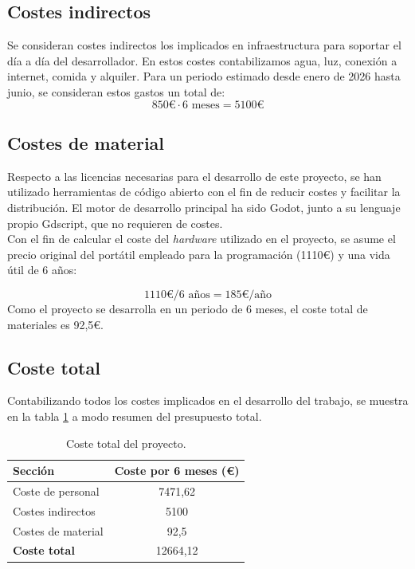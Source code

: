 \subsection{Costes indirectos}
Se consideran costes indirectos los implicados en infraestructura para soportar el día a día del desarrollador. En estos costes contabilizamos agua, luz, conexión a internet, comida y alquiler. Para un periodo estimado desde enero de 2026 hasta junio, se consideran estos gastos un total de:
\[ 
	850\euro \cdot 6 \text{ meses} = 5100\euro
\]
\subsection{Costes de material}
Respecto a las licencias necesarias para el desarrollo de este proyecto, se han utilizado herramientas de código abierto con el fin de reducir costes y facilitar la distribución. El motor de desarrollo principal ha sido Godot, junto a su lenguaje propio Gdscript, que no requieren de costes. \\

Con el fin de calcular el coste del \textit{hardware} utilizado en el proyecto, se asume el precio original del portátil empleado para la programación (1110\euro)  y una vida útil de 6 años:

\[
1110 \euro / 6 \text{ años} = 185 \euro /\text{año}
\]
Como el proyecto se desarrolla en un periodo de 6 meses, el coste total de materiales es 92,5\euro.
\subsection{Coste total}
Contabilizando todos los costes implicados en el desarrollo del trabajo, se muestra en la tabla \ref{table:Presupuesto del proyecto} a modo resumen del presupuesto total.

\begin{table}[H]
	\centering
	\caption{Coste total del proyecto.}
	\label{table:Presupuesto del proyecto}
	\begin{tabular}{|l|c|}
		\hline
		\textbf{Sección}  & \textbf{Coste por 6 meses (\euro)}\\
		\hline
		Coste de personal & 7471,62 \\
		Costes indirectos & 5100 \\
	Costes de material & 92,5 \\
	\textbf{Coste total} & 12664,12 \\
		\hline
	\end{tabular}
	
\end{table}
